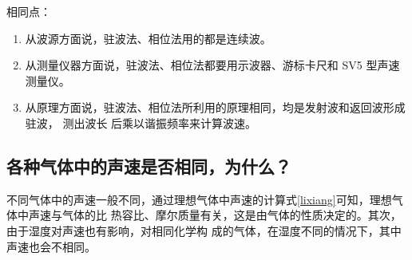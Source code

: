 \documentclass{article}
\begin{document}
相同点：
\begin{enumerate}
    \item 从波源方面说，驻波法、相位法用的都是连续波。
    \item 从测量仪器方面说，驻波法、相位法都要用示波器、游标卡尺和 SV5 型声速测量仪。
    \item 从原理方面说，驻波法、相位法所利用的原理相同，均是发射波和返回波形成驻波， 测出波长
    后乘以谐振频率来计算波速。
\end{enumerate}
\subsection*{各种气体中的声速是否相同，为什么？}
不同气体中的声速一般不同，通过理想气体中声速的计算式\eqref{lixiang}可知，理想气体中声速与气体的比
热容比、摩尔质量有关，这是由气体的性质决定的。其次，由于湿度对声速也有影响，对相同化学构
成的气体，在湿度不同的情况下，其中声速也会不相同。
\end{document}
